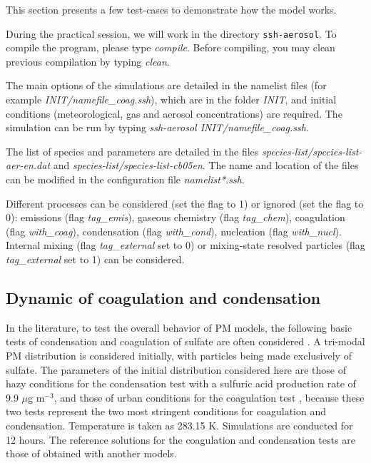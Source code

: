 \documentclass[a4paper,11pt]{article}
\newcommand{\cmd}[1]{\texttt{\color{blue}#1}}
\begin{document}
This section presents a few test-cases to demonstrate how the model works.

During the practical session, we will work in the directory
\cmd{ssh-aerosol}. 
To compile the program, please type {\it{compile}}. Before compiling, you may
clean previous compilation by typing {\it{clean}}.

The main options of the simulations are detailed in the namelist files (for
example {\it{INIT/namefile\_coag.ssh}}), which are in the folder {\it{INIT}}, and
initial conditions (meteorological, gas and aerosol concentrations) are
required.
The simulation can be run by typing {\it{ssh-aerosol INIT/namefile\_coag.ssh}}.

The list of species and parameters are detailed in the files {\it{species-list/species-list-aer-en.dat}} and {\it{species-list/species-list-cb05en}}. The name and location of the files can be modified in the configuration file {\it{namelist*.ssh}}.

Different processes can be considered (set the flag to 1) or ignored (set the flag to 0): emissions (flag {\it{tag\_emis}}),
gaseous chemistry (flag {\it{tag\_chem}}),
coagulation (flag {\it{with\_coag}}),
condensation (flag {\it{with\_cond}}),
nucleation (flag {\it{with\_nucl}}).
Internal mixing (flag {\it{tag\_external}} set to 0) or mixing-state resolved particles (flag {\it{tag\_external}} set to 1) can be considered. 

\subsection{Dynamic of coagulation and condensation}

In the literature, to test the overall behavior of PM models, the following 
basic tests of
condensation and coagulation of sulfate are often considered \cite{seigneur1986simulation,zhang1999simulation,binkowski2003models}. A tri-modal PM distribution is considered initially,
with particles being made exclusively of sulfate. The parameters of the initial distribution
considered here are those of hazy conditions for the condensation test with a sulfuric
acid production rate of 9.9 $\mu$g m$^{-3}$, and those of urban conditions for the coagulation test \cite{seigneur1986simulation,zhang1999simulation} , because these two tests represent the two most
stringent conditions for coagulation and condensation. Temperature is taken as 283.15 K.
Simulations are conducted for 12 hours.
The reference solutions for the coagulation and condensation tests are those of \cite{zhang1999simulation} obtained with another models.
\end{document}
